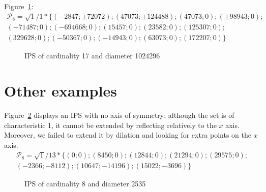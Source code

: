 \documentclass[12pt]{article}
\theoremstyle{theorem}
\theoremstyle{dfn}
\theoremstyle{remark}
\begin{document}
Figure~\ref{17_1024296_1_639b}:
\begin{multline}
	\mathcal{P}_8=
	\sqrt{1}/1*\{
		( -2847 ; \pm72072);
		( 47073 ; \pm124488);
		( 47073 ; 0);
		( \pm98943 ; 0);
		\\
		( -71487 ; 0);
		( -694668 ; 0);
		( 15457 ; 0);
		( 23582 ; 0);
		( 125307 ; 0);
		\\
		( 329628 ; 0);
		( -50367 ; 0);
		( -14943 ; 0);
		( 63073 ; 0);
		( 172207 ; 0)
	\}
\end{multline}

\begin{figure}[h!]
\parbox{1\linewidth}{\caption{IPS of cardinality 17 and diameter 1024296}
\label{17_1024296_1_639b}}
\end{figure}




\section{Other examples}

Figure~\ref{8_2535_1_d680} displays an IPS with
no axis of symmetry;
although the set is of characteristic 1,
it cannot be extended by reflecting relatively to the $x$ axis.
Moreover, we failed to extend it by dilation and looking for extra points on the $x$ axis.
%
%
\begin{multline}
	\mathcal{P}_8=
	\sqrt{1}/13*
	\{
	( 0 ; 0);
	( 8450 ; 0);
	( 12844 ; 0);
	( 21294 ; 0);
	( 29575 ; 0);
	\\
	( -2366 ; -8112);
	( 10647 ; -14196);
	( 15022 ; -3696)
	\}
\end{multline}
%
\begin{figure}[h!]
\parbox{1\linewidth}{\caption{IPS of cardinality 8 and diameter 2535}
\label{8_2535_1_d680}}
\end{figure}
\end{document}
